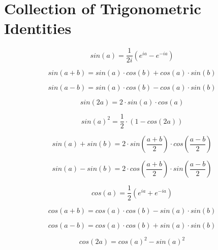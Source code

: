 \documentclass[./\jobname.tex]{subfiles}
\begin{document}
\chapter{Collection of Trigonometric Identities}

\begin{equation*}
	sin(a) = \frac{1}{2i} \left( e^{ia} - e^{-ia} \right)
\end{equation*}

\begin{equation*}
	sin(a + b) = sin(a) \cdot cos(b) + cos(a) \cdot sin(b)
\end{equation*}

\begin{equation}
	sin(a - b) = sin(a) \cdot cos(b) - cos(a) \cdot sin(b)
\end{equation}

\begin{equation*}
	sin(2a) = 2 \cdot sin(a) \cdot cos(a)
\end{equation*}

\begin{equation*}
	sin(a)^2 = \frac{1}{2} \cdot (1 - cos(2a))
\end{equation*}

\begin{equation*}
	sin(a) + sin(b) = 2 \cdot sin\left( \frac{a + b}{2} \right) \cdot cos\left( \frac{a -b}{2} \right)
\end{equation*}

\begin{equation*}
	sin(a) - sin(b) = 2 \cdot cos\left( \frac{a + b}{2} \right) \cdot sin\left( \frac{a - b}{2} \right)
\end{equation*}

\noindent\makebox[\linewidth]{\rule{\paperwidth}{0.4pt}}

\begin{equation*}
	cos(a) = \frac{1}{2} \left( e^{ia} + e^{-ia} \right)
\end{equation*}

\begin{equation*}
	cos(a + b) = cos(a) \cdot cos(b) - sin(a) \cdot sin(b)
\end{equation*}

\begin{equation*}
	cos(a - b) = cos(a) \cdot cos(b) + sin(a) \cdot sin(b)
\end{equation*}

\begin{equation*}
	cos(2a) = cos(a)^2 - sin(a)^2
\end{equation*}
\end{document}
